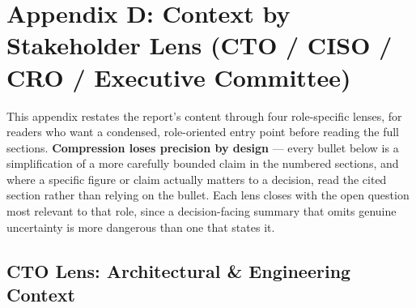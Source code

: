 \section*{Appendix D: Context by Stakeholder Lens (CTO / CISO / CRO / Executive Committee)}

This appendix restates the report's content through four role-specific lenses, for readers who want a condensed, role-oriented entry point before reading the full sections. \textbf{Compression loses precision by design} --- every bullet below is a simplification of a more carefully bounded claim in the numbered sections, and where a specific figure or claim actually matters to a decision, read the cited section rather than relying on the bullet. Each lens closes with the open question most relevant to that role, since a decision-facing summary that omits genuine uncertainty is more dangerous than one that states it.

\subsection*{CTO Lens: Architectural \& Engineering Context}

